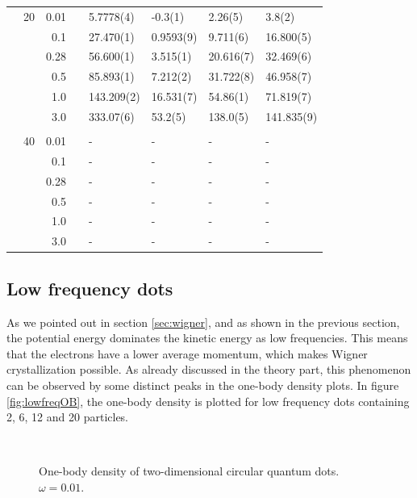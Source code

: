 \begin{table}
\begin{tabularx}{\textwidth}{R{1.5cm}rrcR{2.3cm}R{2.3cm}R{2.3cm}R{2.3cm}}
		&20 & 0.01 && 5.7778(4) & -0.3(1) & 2.26(5) & 3.8(2) \\
		&& 0.1 && 27.470(1) & 0.9593(9) & 9.711(6) & 16.800(5) \\
		&& 0.28 && 56.600(1) & 3.515(1) & 20.616(7) & 32.469(6) \\
		&& 0.5 && 85.893(1) & 7.212(2) & 31.722(8) & 46.958(7) \\
		&& 1.0 && 143.209(2) & 16.531(7) & 54.86(1) & 71.819(7) \\
		&& 3.0 && 333.07(6) & 53.2(5) & 138.0(5) & 141.835(9) \\ \hdashline \\
		
		&40 & 0.01 && - & - & - & - \\
		&& 0.1 && - & - & - & - \\
		&& 0.28 && - & - & - & - \\
		&& 0.5 && - & - & - & - \\
		&& 1.0 && - & - & - & - \\
		&& 3.0 && - & - & - & - \\ \hline \hline
	\end{tabularx}
\end{table}
\fi

\newpage
\subsection{Low frequency dots}
As we pointed out in section \ref{sec:wigner}, and as shown in the previous section, the potential energy dominates the kinetic energy as low frequencies. This means that the electrons have a lower average momentum, which makes Wigner crystallization possible. As already discussed in the theory part, this phenomenon can be observed by some distinct peaks in the one-body density plots. In figure \eqref{fig:lowfreqOB}, the one-body density is plotted for low frequency dots containing 2, 6, 12 and 20 particles. 

\begin{figure}[H]
	\centering
	\\
	\caption{One-body density of two-dimensional circular quantum dots. $\omega=0.01$.}
	\label{fig:lowfreqOB}
\end{figure}

